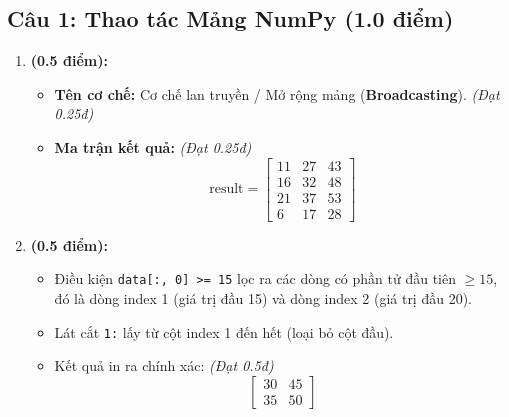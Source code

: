 \documentclass[11pt,a4paper]{article}
\begin{document}
\subsection*{Câu 1: Thao tác Mảng NumPy (1.0 điểm)}
\begin{enumerate}[label=\textbf{\alph*)}]
  \item \textbf{(0.5 điểm):}
  \begin{itemize}
    \item \textbf{Tên cơ chế:} Cơ chế lan truyền / Mở rộng mảng (\textbf{Broadcasting}). \textit{(Đạt 0.25đ)}
    \item \textbf{Ma trận kết quả:} \textit{(Đạt 0.25đ)}
    $$\text{result} = \begin{bmatrix}
      11 & 27 & 43 \\
      16 & 32 & 48 \\
      21 & 37 & 53 \\
      6  & 17 & 28
    \end{bmatrix}$$
  \end{itemize}

  \item \textbf{(0.5 điểm):}
  \begin{itemize}
    \item Điều kiện \texttt{data[:, 0] >= 15} lọc ra các dòng có phần tử đầu tiên $\ge 15$, đó là dòng index 1 (giá trị đầu 15) và dòng index 2 (giá trị đầu 20).
    \item Lát cắt \texttt{1:} lấy từ cột index 1 đến hết (loại bỏ cột đầu).
    \item Kết quả in ra chính xác: \textit{(Đạt 0.5đ)}
    $$\begin{bmatrix}
      30 & 45 \\
      35 & 50
    \end{bmatrix}$$
  \end{itemize}
\end{enumerate}
\end{document}
